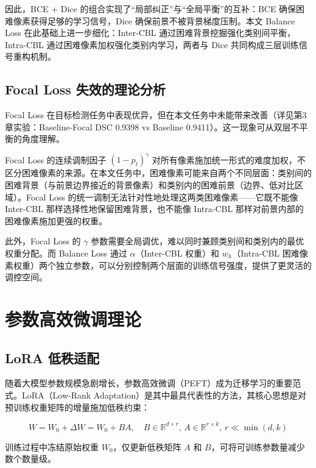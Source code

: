 因此，BCE + Dice 的组合实现了“局部纠正”与“全局平衡”的互补：BCE 确保困难像素获得足够的学习信号，Dice 确保前景不被背景梯度压制。本文 Balance Loss 在此基础上进一步细化：Inter-CBL 通过困难背景挖掘强化类别间平衡，Intra-CBL 通过困难像素加权强化类别内学习，两者与 Dice 共同构成三层训练信号重构机制。

\subsection{Focal Loss 失效的理论分析}

Focal Loss 在目标检测任务中表现优异，但在本文任务中未能带来改善（详见第3章实验：Baseline-Focal DSC 0.9398 vs Baseline 0.9411）。这一现象可从双层不平衡的角度理解。

Focal Loss 的连续调制因子 $(1-p_t)^\gamma$ 对所有像素施加统一形式的难度加权，不区分困难像素的来源。在本文任务中，困难像素可能来自两个不同层面：类别间的困难背景（与前景边界接近的背景像素）和类别内的困难前景（边界、低对比区域）。Focal Loss 的统一调制无法针对性地处理这两类困难像素——它既不能像 Inter-CBL 那样选择性地保留困难背景，也不能像 Intra-CBL 那样对前景内部的困难像素施加更强的权重。

此外，Focal Loss 的 $\gamma$ 参数需要全局调优，难以同时兼顾类别间和类别内的最优权重分配。而 Balance Loss 通过 $\alpha$（Inter-CBL 权重）和 $w_h$（Intra-CBL 困难像素权重）两个独立参数，可以分别控制两个层面的训练信号强度，提供了更灵活的调控空间。

\section{参数高效微调理论}

\subsection{LoRA 低秩适配}
\label{sec:lora_theory}

随着大模型参数规模急剧增长，参数高效微调（PEFT）成为迁移学习的重要范式\cite{ding2022peftsurvey}。LoRA（Low-Rank Adaptation）\cite{hu2022lora}是其中最具代表性的方法，其核心思想是对预训练权重矩阵的增量施加低秩约束：

\begin{equation}
W = W_0 + \Delta W = W_0 + BA, \quad B \in \mathbb{R}^{d \times r}, \, A \in \mathbb{R}^{r \times k}, \, r \ll \min(d,k)
\end{equation}

训练过程中冻结原始权重 $W_0$，仅更新低秩矩阵 $A$ 和 $B$，可将可训练参数量减少数个数量级。

